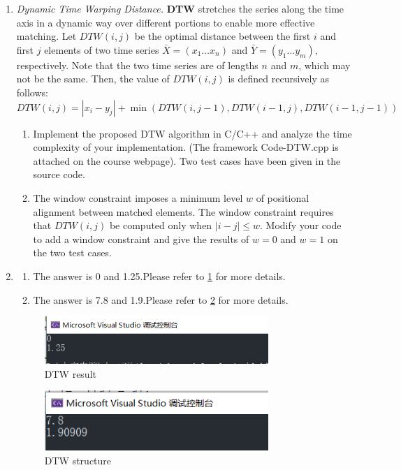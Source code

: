 \documentclass[12pt,a4paper]{article}
\makeatletter
\newtheorem*{solution}{Solution}
\theoremstyle{definition}
\renewenvironment{solution}[1][Solution] {\par\pushQED{\qed}\normalfont\topsep6\p@\@plus6\p@\relax\trivlist\item[\hskip\labelsep\bfseries#1\@addpunct{.}]\ignorespaces}{\popQED\endtrivlist\@endpefalse} \makeatother
\makeatother
\begin{document}
\begin{enumerate}
		\item \textit{Dynamic Time Warping Distance.} \textbf{DTW} stretches the series along the time axis in a dynamic way over different
		portions to enable more effective matching. Let $D T W(i, j)$ be the optimal distance between the first $i$ and first $j$ elements of two time series $\bar{X}=\left(x_{1} \ldots x_{n}\right)$ and $\bar{Y}=\left(y_{1} \ldots y_{m}\right),$ respectively. Note that the two time series are of lengths $n$ and $m$, which may not be the same. Then, the value of $D T W(i, j)$ is defined recursively as follows:
		$$
		DTW(i, j)=\left|x_{i}- y_{j}\right|+\min(DTW(i, j-1), DTW(i-1, j), DTW(i-1, j-1))
		$$
		
		\begin{enumerate}
			\item Implement the proposed DTW algorithm in C/C++ and analyze the time complexity of your implementation. ({\color{blue}The framework Code-DTW.cpp is attached on the course webpage}). Two test cases have been given in the source code. 
			\item The window constraint imposes a minimum level $w$ of positional alignment between matched elements. The window constraint requires that $DTW(i, j)$ be computed only when $|i-j| \leq w$. Modify your code to add a window constraint and give the results of $ w=0 $ and $ w=1 $ on the two test cases. 
		\end{enumerate}
		    \begin{solution}
		    \begin{enumerate}
		        \item The answer is 0 and 1.25.Please refer to \ref{DTW1} for more details.
		        \item The answer is 7.8 and 1.9.Please refer to \ref{DTW2} for more details.
		    \end{enumerate}
        \begin{figure}[htbp]
        \centering
        \includegraphics[width=0.8\textwidth]{DTW1.png}
        \caption{DTW result}\label{DTW1}
        \end{figure}
        \begin{figure}[htbp]
        \centering
        \includegraphics[width=0.8\textwidth]{DTW2.png}
        \caption{DTW structure}\label{DTW2}
        \end{figure}
		    \end{solution}
		
	\end{enumerate}
	
\end{document}
